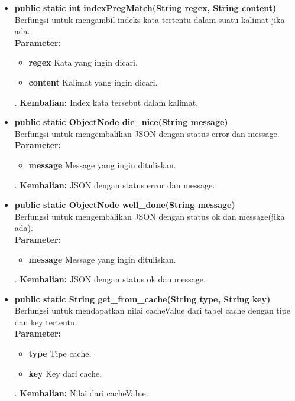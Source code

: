 \begin{enumerate}
\begin{itemize}
		\item \textbf{public static int indexPregMatch(String regex, String content)}\\
		Berfungsi untuk mengambil indeks kata tertentu dalam suatu kalimat jika ada.\\
		\textbf{Parameter:}
				\begin{itemize}
					\item \textbf{regex} Kata yang ingin dicari.
					\item \textbf{content} Kalimat yang ingin dicari.
				\end{itemize}.
		\textbf{Kembalian:}  Index kata tersebut dalam kalimat.
		
		\item \textbf{public static ObjectNode die\_nice(String message)}\\
		Berfungsi untuk mengembalikan JSON dengan status error dan message.\\
		\textbf{Parameter:}
				\begin{itemize}
					\item \textbf{message} Message yang ingin dituliskan.
				\end{itemize}.
		\textbf{Kembalian:}  JSON dengan status error dan message.
		
		\item \textbf{public static ObjectNode well\_done(String message)}\\
		Berfungsi untuk mengembalikan JSON dengan status ok dan message(jika ada).\\
		\textbf{Parameter:}
				\begin{itemize}
					\item \textbf{message} Message yang ingin dituliskan.
				\end{itemize}.
		\textbf{Kembalian:}  JSON dengan status ok dan message.
		
		\item \textbf{public static String get\_from\_cache(String type, String key)}\\
		Berfungsi untuk mendapatkan nilai cacheValue dari tabel cache dengan tipe dan key tertentu.\\
		\textbf{Parameter:}
				\begin{itemize}
					\item \textbf{type} Tipe cache.
					\item \textbf{key} Key dari cache.
				\end{itemize}.
		\textbf{Kembalian:}  Nilai dari cacheValue.
	

\end{itemize}
\end{enumerate}
